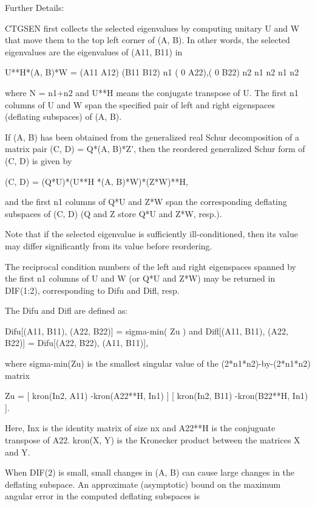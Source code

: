 \begin{DoxyParagraph}{Further Details\+: }
\begin{DoxyVerb}  CTGSEN first collects the selected eigenvalues by computing unitary
  U and W that move them to the top left corner of (A, B). In other
  words, the selected eigenvalues are the eigenvalues of (A11, B11) in

              U**H*(A, B)*W = (A11 A12) (B11 B12) n1
                              ( 0  A22),( 0  B22) n2
                                n1  n2    n1  n2

  where N = n1+n2 and U**H means the conjugate transpose of U. The first
  n1 columns of U and W span the specified pair of left and right
  eigenspaces (deflating subspaces) of (A, B).

  If (A, B) has been obtained from the generalized real Schur
  decomposition of a matrix pair (C, D) = Q*(A, B)*Z', then the
  reordered generalized Schur form of (C, D) is given by

           (C, D) = (Q*U)*(U**H *(A, B)*W)*(Z*W)**H,

  and the first n1 columns of Q*U and Z*W span the corresponding
  deflating subspaces of (C, D) (Q and Z store Q*U and Z*W, resp.).

  Note that if the selected eigenvalue is sufficiently ill-conditioned,
  then its value may differ significantly from its value before
  reordering.

  The reciprocal condition numbers of the left and right eigenspaces
  spanned by the first n1 columns of U and W (or Q*U and Z*W) may
  be returned in DIF(1:2), corresponding to Difu and Difl, resp.

  The Difu and Difl are defined as:

       Difu[(A11, B11), (A22, B22)] = sigma-min( Zu )
  and
       Difl[(A11, B11), (A22, B22)] = Difu[(A22, B22), (A11, B11)],

  where sigma-min(Zu) is the smallest singular value of the
  (2*n1*n2)-by-(2*n1*n2) matrix

       Zu = [ kron(In2, A11)  -kron(A22**H, In1) ]
            [ kron(In2, B11)  -kron(B22**H, In1) ].

  Here, Inx is the identity matrix of size nx and A22**H is the
  conjuguate transpose of A22. kron(X, Y) is the Kronecker product between
  the matrices X and Y.

  When DIF(2) is small, small changes in (A, B) can cause large changes
  in the deflating subspace. An approximate (asymptotic) bound on the
  maximum angular error in the computed deflating subspaces is


\end{DoxyVerb}
\end{DoxyParagraph}
